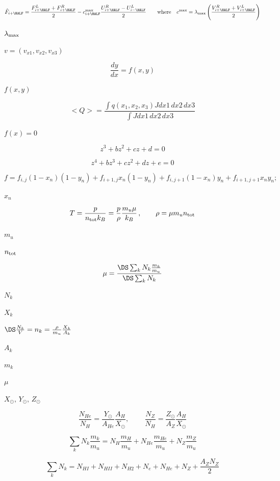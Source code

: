\documentclass{article}
\begin{document}
\[    \hat{F}_{i+\HALF} = \frac{F^L_{i+\HALF} + F^R_{i+\HALF}}{2}
 - c^{\rm max}_{i+\HALF}\frac{U^R_{i+\HALF} - U^L_{i-\HALF}}{2}
   \qquad{\rm where}\quad c^{\rm max} = \lambda_{\rm max}\left(
        \frac{V^R_{i+\HALF} + V^L_{i+\HALF}}{2}\right)
\]
\pagebreak

$\lambda_{\rm \max}$
\pagebreak

$ v = (v_{x1}, v_{x2}, v_{x3})$
\pagebreak

\[     \frac{dy}{dx} = f(x,y)
\]
\pagebreak

$f(x,y)$
\pagebreak

\[   <Q> = \frac{\int q(x_1, x_2, x_3) J dx1\,dx2\,dx3}
              {\int J dx1\,dx2\,dx3} 
\]
\pagebreak

$ f(x) = 0$
\pagebreak

\[     z^3 + bz^2 + cz + d = 0
\]
\pagebreak

\[     z^4 + bz^3 + cz^2 + dz + e = 0
\]
\pagebreak

\[     f =   f_{i,j}(1 - x_n)(1 - y_n) + f_{i+1,j}x_n(1 - y_n)
         + f_{i,j+1}(1 - x_n)y_n     + f_{i+1,j+1}x_ny_n;
\]
\pagebreak

$ x_n$
\pagebreak

\[  T = \frac{p}{n_{\rm tot}k_B} = \frac{p}{\rho}\frac{m_u\mu}{k_B}
  \,,\qquad
  \rho = \mu m_u n_{\rm tot}
\]
\pagebreak

$ m_u $
\pagebreak

$ n_{\rm tot} $
\pagebreak

\[  \mu = \frac{\DS\sum_k N_k \frac{m_k}{m_u}}{\DS\sum_k N_k}
\]
\pagebreak

$ N_k $
\pagebreak

$X_k$
\pagebreak

$\DS \frac{N_k}{V} = n_k = \frac{\rho}{m_u}\frac{X_k}{A_k}$
\pagebreak

$A_k$
\pagebreak

$ m_k $
\pagebreak

$\mu$
\pagebreak

$ X_{\odot},\, Y_{\odot},\, Z_{\odot}$
\pagebreak

\[     \frac{N_{He}}{N_H} = \frac{Y_{\odot}}{A_{He}}\frac{A_H}{X_\odot}
     ,\,\qquad
     \frac{N_Z}{N_H} = \frac{Z_{\odot}}{A_{Z}}\frac{A_H}{X_\odot}
\]
\pagebreak

\[     \sum_k N_k \frac{m_k}{m_u} =   N_H   \frac{m_H}{m_u}
                                  + N_{He}\frac{m_{He}}{m_u}
                                  + N_Z   \frac{m_Z}{m_u}
\]
\pagebreak

\[     \sum_k N_k = N_{HI} + N_{HII} + N_{H2} + N_e + N_{He} + N_Z
                 + \frac{A_ZN_Z}{2}
\]
\pagebreak
\end{document}
